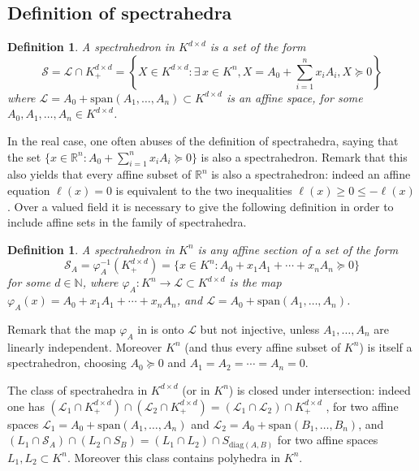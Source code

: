 \documentclass[a4paper,oneside,10pt]{article}
\newtheorem{definition}[theorem]{Definition}
\renewcommand{\span}[1]{{\text{span}(#1)}} %
\def\diag{\mathrm{diag}}
\begin{document}
\subsection{Definition of spectrahedra}

\begin{definition}
  \label{def_spectrahedra}
  A \emph{spectrahedron in $K^{d\times d}$} is a set of the form
  $$
  \mathcal{S} = \mathcal{L} \cap K^{d\times d}_+ = \left\{X \in K^{d \times d} :
  \exists \, x \in K^n, X = A_0 + \sum_{i=1}^n x_i A_i, X \succeq 0\right\}
  $$
  where $\mathcal{L} = A_0+\span{A_1,\ldots,A_n} \subset K^{d \times d}$ is an affine space, for some
  $A_0,A_1,\ldots,A_n \in K^{d\times d}$.
\end{definition}

In the real case, one often abuses of the definition of spectrahedra, saying that the set
$\{x \in \mathbb{R}^n : A_0+\sum_{i=1}^n x_iA_i \succeq 0\}$ is also a spectrahedron.
Remark that this also yields that every affine subset of $\mathbb{R}^n$ is also
a spectrahedron: indeed an affine equation $\ell(x) = 0$ is equivalent to the two inequalities
$\ell(x) \geq 0 \leq -\ell(x)$. Over a valued field it is necessary to give the following
definition in order to include affine sets in the family of spectrahedra.

\begin{definition}
  \label{def_spectrahedra_Kn}
  A \emph{spectrahedron in $K^n$} is any affine section of a set of the form
  $$
  \mathcal{S}_A = \varphi_A^{-1}(K^{d \times d}_+) = \{x \in K^n : A_0+x_1A_1+\cdots+x_nA_n \succeq 0\}
  $$
  for some $d\in \mathbb{N}$,
  where $\varphi_A : K^n \to \mathcal{L} \subset K^{d \times d}$ is the map
  $\varphi_A(x) = A_0+x_1A_1+\cdots+x_nA_n$, and $\mathcal{L} = A_0+\span{A_1,\ldots,A_n}$.
\end{definition}

Remark that the map $\varphi_A$ in  is onto $\mathcal{L}$ but not
injective, unless $A_1,\ldots,A_n$ are linearly independent. Moreover $K^n$ (and thus every affine
subset of $K^n$) is itself a spectrahedron, choosing $A_0 \succeq 0$ and $A_1=A_2=\cdots=A_n=0$.

The class of spectrahedra in $K^{d \times d}$ (or in $K^n$) is closed under intersection: indeed one
has $(\mathcal{L}_1 \cap K^{d \times d}_+) \cap (\mathcal{L}_2 \cap K^{d \times d}_+) =
(\mathcal{L}_1 \cap \mathcal{L}_2) \cap K^{d \times d}_+$
, for two affine spaces
$\mathcal{L}_1 = A_0+\span{A_1,\ldots,A_n}$ and $\mathcal{L}_2 = A_0+\span{B_1,\ldots,B_n}$,
and
$(L_1 \cap \mathcal{S}_A) \cap (L_2 \cap S_B) = (L_1\cap L_2) \cap S_{\diag(A,B)}$ for
two affine spaces $L_1,L_2 \subset K^n$.
Moreover this class contains polyhedra in $K^n$.
\end{document}
